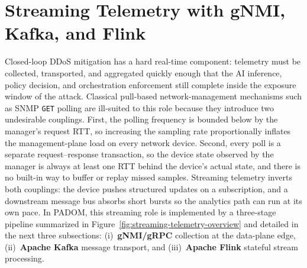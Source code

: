 \documentclass[12pt, a4paper, reqno, oneside]{book}
\newcommand{\padonap}{\textsc{PADOM}}
\begin{document}
\section{Streaming Telemetry with gNMI, Kafka, and Flink}
\label{sec:streaming-telemetry-bg}

Closed-loop DDoS mitigation has a hard real-time component: telemetry must be
collected, transported, and aggregated quickly enough that the AI inference,
policy decision, and orchestration enforcement still complete inside the
exposure window of the attack. Classical pull-based network-management
mechanisms such as SNMP \texttt{GET} polling are ill-suited to this role
because they introduce two undesirable couplings. First, the polling
frequency is bounded below by the manager's request RTT, so increasing the
sampling rate proportionally inflates the management-plane load on every
network device. Second, every poll is a separate request--response
transaction, so the device state observed by the manager is always at least
one RTT behind the device's actual state, and there is no built-in way to
buffer or replay missed samples. Streaming telemetry inverts both couplings:
the device pushes structured updates on a subscription, and a downstream
message bus absorbs short bursts so the analytics path can run at its own
pace. In \padonap{}, this streaming role is implemented by a three-stage
pipeline summarized in
Figure~\ref{fig:streaming-telemetry-overview} and detailed in the next three
subsections: (i)~\textbf{gNMI/gRPC} collection at the data-plane edge,
(ii)~\textbf{Apache Kafka} message transport, and (iii)~\textbf{Apache Flink}
stateful stream processing.
\end{document}
